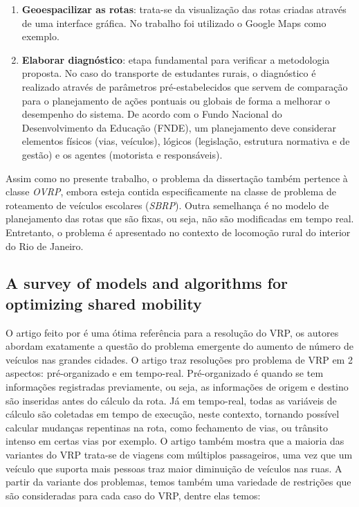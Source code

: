 \begin{enumerate}
    \item \textbf{Geoespacilizar as rotas}: trata-se da visualização das rotas criadas através de uma interface gráfica. No trabalho foi utilizado o Google Maps como exemplo.
    
    \item \textbf{Elaborar diagnóstico}: etapa fundamental para verificar a metodologia proposta. No caso do transporte de estudantes rurais, o diagnóstico é realizado através de parâmetros pré-estabelecidos que servem de comparação para o planejamento de ações pontuais ou globais de forma a melhorar o desempenho do sistema. De acordo com o Fundo Nacional do Desenvolvimento da Educação (FNDE), um planejamento deve considerar elementos físicos (vias, veículos), lógicos (legislação, estrutura normativa e de gestão) e os agentes (motorista e responsáveis). 
\end{enumerate}

Assim como no presente trabalho, o problema da dissertação também pertence à classe \emph{OVRP}, embora esteja contida especificamente na classe de problema de roteamento de veículos escolares (\emph{SBRP}). Outra semelhança é no modelo de planejamento das rotas que são fixas, ou seja, não são modificadas em tempo real. Entretanto, o problema é apresentado no contexto de locomoção rural do interior do Rio de Janeiro.


\subsection{A survey of models and algorithms for optimizing shared mobility \cite{MOURAD2019323}}

O artigo feito por \cite{MOURAD2019323} é uma ótima referência para a resolução do VRP, os autores abordam exatamente a questão do problema emergente do aumento de número de veículos nas grandes cidades. O artigo traz resoluções pro problema de VRP em 2 aspectos: pré-organizado e em tempo-real. Pré-organizado é quando se tem informações  registradas previamente, ou seja, as informações de origem e destino são inseridas antes do cálculo da rota. Já em tempo-real, todas as variáveis de cálculo são coletadas em tempo de execução, neste contexto, tornando possível calcular mudanças repentinas na rota, como fechamento de vias, ou trânsito intenso em certas vias por exemplo. O artigo também mostra que a maioria das variantes do VRP trata-se de viagens com múltiplos passageiros, uma vez que um veículo que suporta mais pessoas traz maior diminuição de veículos nas ruas.
A partir da variante dos problemas, temos também uma variedade de restrições que são consideradas para cada caso do VRP, dentre elas temos:

